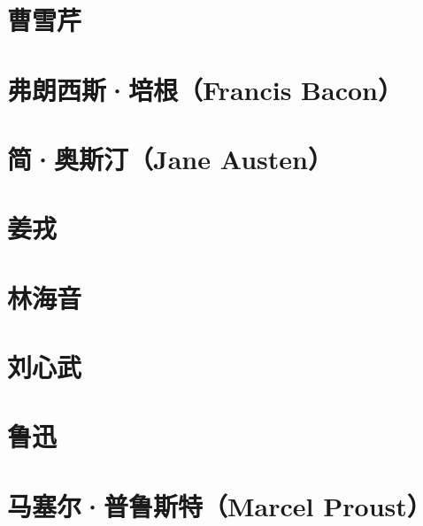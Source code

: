 \documentclass[12pt,utf8]{book}
\begin{document}
% 


\chapter{曹雪芹}


\clearpage

\chapter{弗朗西斯·培根（Francis Bacon）}


% 


\chapter{简·奥斯汀（Jane Austen）}

% 


\chapter{姜戎}


% 

\chapter{林海音}

% 

\chapter{刘心武}

% 

\chapter{鲁迅}


\clearpage


\chapter{马塞尔·普鲁斯特（Marcel Proust）}


\clearpage
\end{document}
